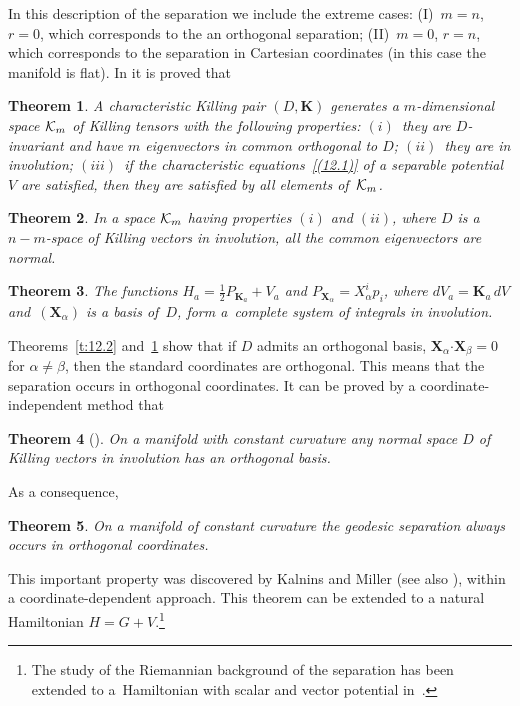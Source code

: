 \documentclass[pdftex]{sigma}
\def\bs{\boldsymbol}
\numberwithin{equation}{section}
\newtheorem{Theorem}{Theorem}[section]
 { \theoremstyle{definition}
\newtheorem{Notation}[Theorem]{Notation}
\newtheorem{Example}[Theorem]{Example}
\newtheorem{Remark}[Theorem]{Remark}
\newtheorem{Remarks}[Theorem]{Remarks}
 }
\begin{document}
In this description of the separation we include the extreme cases: (I)~$m=n$, $r=0$, which corresponds to the an orthogonal separation; (II)~$m=0$, $r=n$, which corresponds to the separation in Cartesian coordinates (in this case the manifold is f\/lat). In \cite{BCR-2002a} it is proved that

\begin{Theorem}\label{t:12.3}
A characteristic Killing pair $(D,\bs K)$ generates a $m$-dimensional space ${\cal K}_m$ of Killing tensors with the following properties:
$(i)$~they are $D$-invariant and have $m$ eigenvectors in common orthogonal to $D$;
$(ii)$~they are in involution;
$(iii)$~if the  characteristic equations~\eqref{(12.1)} of a separable potential $V$ are satisfied, then they are satisfied by all elements of~${\cal K}_m$.
\end{Theorem}

\begin{Theorem}
In a space ${\cal K}_m$ having properties $(i)$ and $(ii)$, where $D$ is a $n-m$-space of Killing vectors in involution, all the common eigenvectors are normal.
\end{Theorem}

\begin{Theorem}
The functions $H_a=\tfrac 12  P_{\bs K_a}+V_a$ and $P_{\bs X_\alpha}=X_\alpha^i p_i$, where $dV_a=\bs K_a\,dV$ and~$(\bs X_\alpha)$ is a basis of~$D$, form a~complete system of integrals in involution.
\end{Theorem}

Theorems~\ref{t:12.2} and~\ref{t:12.3} show that if $D$ admits an orthogonal basis, $\bs X_\alpha{\mathbf\cdot}\bs X_\beta=0$ for $\alpha\neq\beta$, then the standard coordinates are orthogonal. This means that the separation occurs in orthogonal coordinates. It can be proved by a coordinate-independent method that

\begin{Theorem}[\cite{Benenti-1992a}]
On a manifold with constant curvature any normal space $D$ of Killing vectors in involution has an orthogonal basis.
\end{Theorem}

As a consequence,

\begin{Theorem}
On a manifold of constant curvature the geodesic separation always occurs in orthogonal coordinates.
\end{Theorem}

This important property was discovered by Kalnins and Miller \cite{KM-1984a, KM-1986} (see also \cite{Kalnins-1986}), within a coordinate-dependent approach. This theorem can be extended to a natural Hamiltonian $H=G+V$.\footnote{The study of the Riemannian background of the separation has been extended
to a~Hamiltonian with scalar and vector potential in~\cite{BCR-2001}.}
\end{document}
